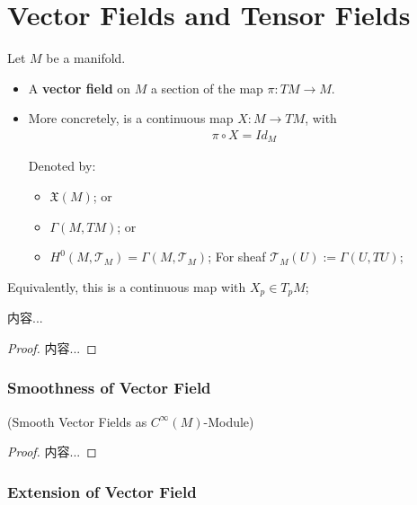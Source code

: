 \documentclass[Total.tex]{subfiles}
\begin{document}
		\section{Vector Fields and Tensor Fields}	
			\begin{Def}
				Let $M$ be a manifold. 
				\begin{itemize}
					\item 
					A \textbf{vector field} on $M$ a section of the map $\pi:TM\rightarrow M$.
					
					\item  More concretely, is a continuous map $X:M\rightarrow TM$, with
					\begin{gather*}
						\pi\circ X=Id_M
					\end{gather*}
					
					Denoted by: 
					\begin{itemize}
						\item $\mathfrak{X}(M)$; or
						\item $\Gamma(M,TM)$; or
						\item $H^0(M,\mathcal{T}_M)=\Gamma(M,\mathcal{T}_M)$; For sheaf $\mathcal{T}_M(U):=\Gamma(U,TU)$;
					\end{itemize}
				\end{itemize}
				
				Equivalently, this is a continuous map with $X_p\in T_p M$;
			\end{Def}
			
			\begin{proposition}
				内容...
			\end{proposition}
			\begin{proof}
				内容...
			\end{proof}
			
			\subsubsection{Smoothness of Vector Field}
			
			\begin{proposition}
				(Smooth Vector Fields as $C^\infty(M)$-Module)
			\end{proposition}
			\begin{proof}
				内容...
			\end{proof}
			\subsubsection{Extension of Vector Field}
			
\end{document}
